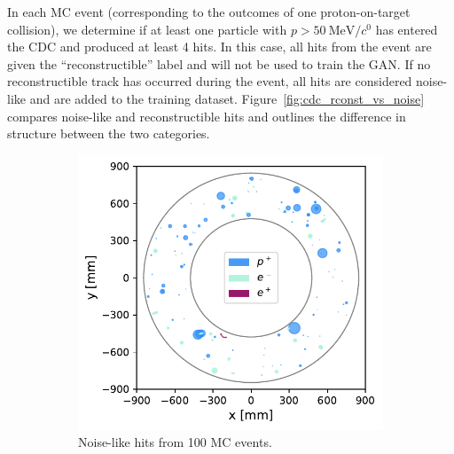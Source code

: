 In each MC event (corresponding to the outcomes of one proton-on-target
collision), we determine if at least one particle with $p >
\SI{50}{\MeV/\clight}$ has entered the CDC and produced at least 4 hits. In this
case, all hits from the event are given the ``reconstructible'' label and will
not be used to train the GAN. If no reconstructible track has occurred during
the event, all hits are considered noise-like and are added to the training
dataset. Figure~\ref{fig:cdc_rconst_vs_noise} compares noise-like and
reconstructible hits and outlines the difference in structure between the two
categories.

\begin{figure}
    \centering
    \captionsetup[subfigure]{justification=centering}
    \begin{subfigure}[t]{0.45\textwidth}
        \centering
        \hspace{-1cm} %
        \includegraphics[width=\textwidth]{chapter4/only_noiselike_events.pdf}
        \caption{Noise-like hits from 100 MC events.}
        \label{fig:cdc_rconst_vs_noise:low}
    \end{subfigure}
    \begin{subfigure}[t]{0.45\textwidth}
        \centering
        \hspace{-1cm} %

\end{subfigure}
\end{figure}
